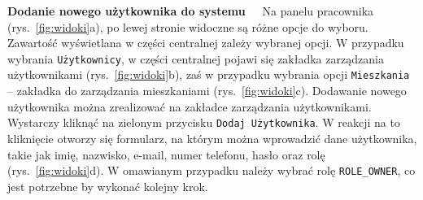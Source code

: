\noindent \textbf{Dodanie nowego użytkownika do systemu~~}
Na panelu pracownika (rys.~\ref{fig:widoki}a), po lewej stronie widoczne są różne opcje do wyboru. Zawartość wyświetlana w części centralnej zależy wybranej opcji. W przypadku wybrania \texttt{Użytkownicy}, w części centralnej pojawi się zakładka zarządzania użytkownikami (rys.~\ref{fig:widoki}b), zaś w przypadku wybrania opcji \texttt{Mieszkania} -- zakładka do zarządzania mieszkaniami (rys.~\ref{fig:widoki}c).
Dodawanie nowego użytkownika można zrealizować na zakładce zarządzania użytkownikami. Wystarczy kliknąć na zielonym przycisku \texttt{Dodaj Użytkownika}. W reakcji na to kliknięcie otworzy się formularz, na którym można wprowadzić dane użytkownika, takie jak imię, nazwisko, e-mail, numer telefonu, hasło oraz rolę (rys.~\ref{fig:widoki}d). W omawianym przypadku należy wybrać rolę \texttt{ROLE\_OWNER}, co jest potrzebne by wykonać kolejny krok.
